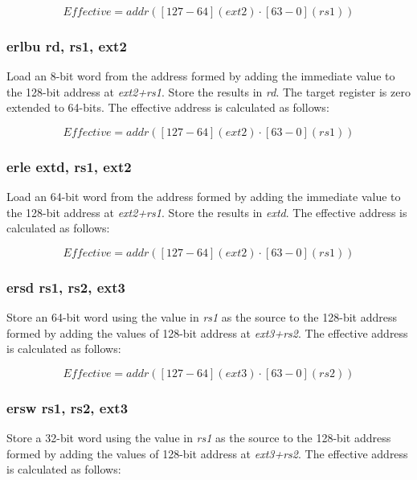 \documentclass{article}
\begin{document}
\begin{equation}
Effective = addr([127-64](ext2) \cdot [63-0](rs1))
\end{equation}

\subsubsection{erlbu rd, rs1, ext2}

Load an 8-bit word from the address formed by adding the immediate value to the 
128-bit address at \textit{ext2+rs1}.  Store the results in \textit{rd}.  
 The target register is zero extended to 64-bits.  The effective 
address is calculated as follows: 

\begin{equation}
Effective = addr([127-64](ext2) \cdot [63-0](rs1))
\end{equation}

\subsubsection{erle extd, rs1, ext2}

Load an 64-bit word from the address formed by adding the immediate value to the 
128-bit address at \textit{ext2+rs1}.  Store the results in \textit{extd}.  
The effective address is calculated as follows:

\begin{equation}
Effective = addr([127-64](ext2) \cdot [63-0](rs1))
\end{equation}

\subsubsection{ersd rs1, rs2, ext3}

Store an 64-bit word using the value in \textit{rs1} as the source 
to the 128-bit address formed by adding the values of
128-bit address at \textit{ext3+rs2}.  The effective address is calculated 
as follows: 

\begin{equation}
Effective = addr([127-64](ext3) \cdot [63-0](rs2))
\end{equation}

\subsubsection{ersw rs1, rs2, ext3}

Store a 32-bit word using the value in \textit{rs1} as the source 
to the 128-bit address formed by adding the values of
128-bit address at \textit{ext3+rs2}.  The effective address is calculated 
as follows: 
\end{document}
